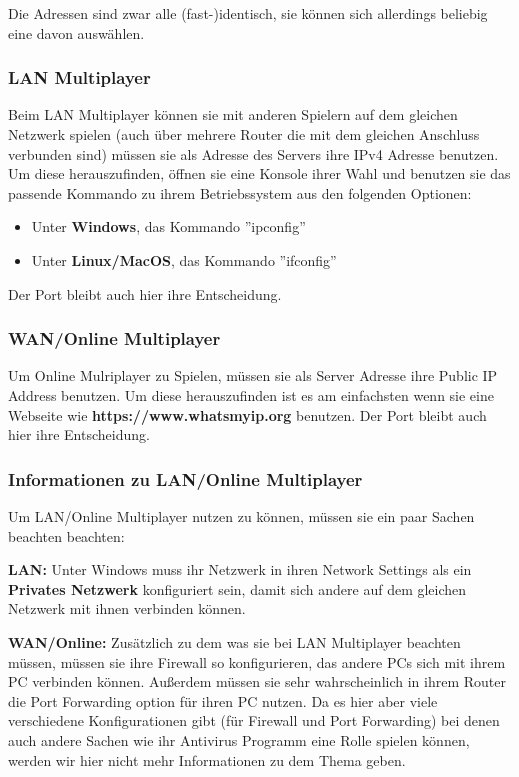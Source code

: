 \documentclass[fontsize=12pt,paper=a4,twoside]{scrartcl}
\begin{document}
Die Adressen sind zwar alle (fast-)identisch, sie können sich allerdings beliebig eine davon auswählen.

\subsubsection{LAN Multiplayer}

Beim LAN Multiplayer können sie mit anderen Spielern auf dem gleichen Netzwerk spielen (auch über mehrere Router die mit dem gleichen Anschluss verbunden sind) müssen sie als Adresse des Servers ihre IPv4 Adresse benutzen. Um diese herauszufinden, öffnen sie eine Konsole ihrer Wahl und benutzen sie das passende Kommando zu ihrem Betriebssystem aus den folgenden Optionen:

\begin{itemize}
\item Unter \textbf{Windows}, das Kommando ''ipconfig''
\item Unter \textbf{Linux/MacOS}, das Kommando ''ifconfig''
\end{itemize}

Der Port bleibt auch hier ihre Entscheidung.

\subsubsection{WAN/Online Multiplayer}

Um Online Mulriplayer zu Spielen, müssen sie als Server Adresse ihre Public IP Address benutzen. Um diese herauszufinden ist es am einfachsten wenn sie eine Webseite wie \textbf{https://www.whatsmyip.org} benutzen. Der Port bleibt auch hier ihre Entscheidung.

\subsubsection{Informationen zu LAN/Online Multiplayer}

Um LAN/Online Multiplayer nutzen zu können, müssen sie ein paar Sachen beachten beachten:

\textbf{LAN:} Unter Windows muss ihr Netzwerk in ihren Network Settings als ein \textbf{Privates Netzwerk} konfiguriert sein, damit sich andere auf dem gleichen Netzwerk mit ihnen verbinden können.

\textbf{WAN/Online:} Zusätzlich zu dem was sie bei LAN Multiplayer beachten müssen, müssen sie ihre Firewall so konfigurieren, das andere PCs sich mit ihrem PC verbinden können. Außerdem müssen sie sehr wahrscheinlich in ihrem Router die Port Forwarding option für ihren PC nutzen. Da es hier aber viele verschiedene Konfigurationen gibt (für Firewall und Port Forwarding) bei denen auch andere Sachen wie ihr Antivirus Programm eine Rolle spielen können, werden wir hier nicht mehr Informationen zu dem Thema geben.
\end{document}
